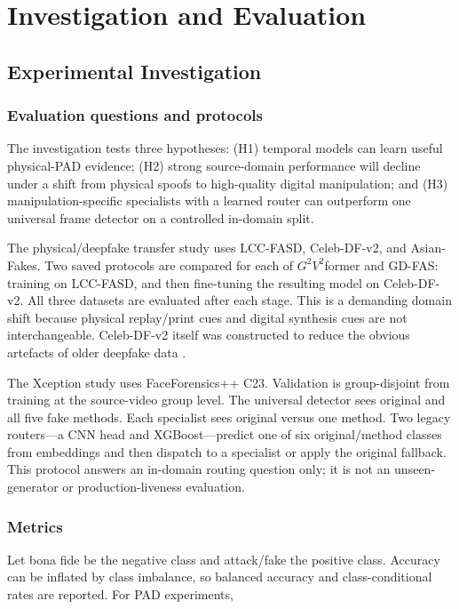 \chapter{Investigation and Evaluation}
\label{ch:evaluation}

\section{Experimental Investigation}

\subsection{Evaluation questions and protocols}

The investigation tests three hypotheses: (H1) temporal models can learn useful
physical-PAD evidence; (H2) strong source-domain performance will decline under a
shift from physical spoofs to high-quality digital manipulation; and (H3)
manipulation-specific specialists with a learned router can outperform one
universal frame detector on a controlled in-domain split.

The physical/deepfake transfer study uses LCC-FASD, Celeb-DF-v2, and Asian-Fakes.
Two saved protocols are compared for each of $G^2V^2$former and GD-FAS: training
on LCC-FASD, and then fine-tuning the resulting model on Celeb-DF-v2. All three
datasets are evaluated after each stage. This is a demanding domain shift because
physical replay/print cues and digital synthesis cues are not interchangeable.
Celeb-DF-v2 itself was constructed to reduce the obvious artefacts of older
deepfake data \cite{li2020celebdf}.

The Xception study uses FaceForensics++ C23. Validation is group-disjoint from
training at the source-video group level. The universal detector sees original
and all five fake methods. Each specialist sees original versus one method. Two
legacy routers---a CNN head and XGBoost---predict one of six original/method
classes from embeddings and then dispatch to a specialist or apply the original
fallback. This protocol answers an in-domain routing question only; it is not an
unseen-generator or production-liveness evaluation.

\subsection{Metrics}

Let bona fide be the negative class and attack/fake the positive class. Accuracy
can be inflated by class imbalance, so balanced accuracy and class-conditional
rates are reported. For PAD experiments,

